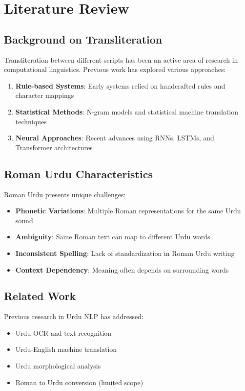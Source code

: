 \documentclass[10pt,twocolumn]{article}
\begin{document}
\section{Literature Review}

\subsection{Background on Transliteration}
Transliteration between different scripts has been an active area of research in computational linguistics. Previous work has explored various approaches:
\begin{enumerate}[label=\arabic*.]
    \item \textbf{Rule-based Systems}: Early systems relied on handcrafted rules and character mappings
    \item \textbf{Statistical Methods}: N-gram models and statistical machine translation techniques
    \item \textbf{Neural Approaches}: Recent advances using RNNs, LSTMs, and Transformer architectures
\end{enumerate}

\subsection{Roman Urdu Characteristics}
Roman Urdu presents unique challenges:
\begin{itemize}[leftmargin=*,noitemsep,topsep=0pt,parsep=0pt,partopsep=0pt]
    \item \textbf{Phonetic Variations}: Multiple Roman representations for the same Urdu sound
    \item \textbf{Ambiguity}: Same Roman text can map to different Urdu words
    \item \textbf{Inconsistent Spelling}: Lack of standardization in Roman Urdu writing
    \item \textbf{Context Dependency}: Meaning often depends on surrounding words
\end{itemize}

\subsection{Related Work}
Previous research in Urdu NLP has addressed:
\begin{itemize}[leftmargin=*,noitemsep,topsep=0pt,parsep=0pt,partopsep=0pt]
    \item Urdu OCR and text recognition
    \item Urdu-English machine translation
    \item Urdu morphological analysis
    \item Roman to Urdu conversion (limited scope)
\end{itemize}
\end{document}
